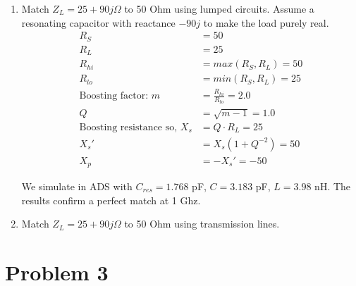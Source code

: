\begin{enumerate}[label=(\alph*)]
    \item Match $Z_L = 25 + 90j \Omega$ to 50 Ohm using lumped circuits.
    Assume a resonating capacitor with reactance $-90j$ to make the load purely real.
    \begin{align*}
        R_S &= 50 \\
        R_L &= 25 \\
        R_{hi} &= max(R_S, R_L) = 50 \\
        R_{lo} &= min(R_S, R_L) = 25 \\
        \text{Boosting factor: } m &= \frac{R_{hi}}{R_{lo}} = 2.0 \\
        Q &= \sqrt{m-1} = 1.0 \\
        \text{Boosting resistance so, } X_s &= Q \cdot R_L = 25 \\
        X_s' &= X_s(1 + Q^{-2}) = 50 \\
        X_p &= -X_s' = -50
    \end{align*}

    We simulate in ADS with $C_{res} = 1.768$ pF, $C = 3.183$ pF, $L = 3.98$ nH. The results confirm a perfect match at 1 Ghz.

    \item Match $Z_L = 25 + 90j \Omega$ to 50 Ohm using transmission lines.
\end{enumerate}

\section*{Problem 3}

